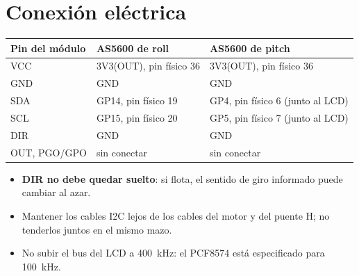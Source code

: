 \documentclass[11pt,a4paper]{article}
\begin{document}
\section{Conexión eléctrica}
\begin{center}
\begin{tabular}{lll}
\toprule
Pin del módulo & AS5600 de roll & AS5600 de pitch\\
\midrule
VCC & 3V3(OUT), pin físico 36 & 3V3(OUT), pin físico 36\\
GND & GND & GND\\
SDA & GP14, pin físico 19 & GP4, pin físico 6 (junto al LCD)\\
SCL & GP15, pin físico 20 & GP5, pin físico 7 (junto al LCD)\\
DIR & GND & GND\\
OUT, PGO/GPO & sin conectar & sin conectar\\
\bottomrule
\end{tabular}
\end{center}
\begin{itemize}
\item \textbf{DIR no debe quedar suelto}: si flota, el sentido de giro informado puede cambiar al azar.
\item Mantener los cables I2C lejos de los cables del motor y del puente H; no tenderlos juntos en el mismo mazo.
\item No subir el bus del LCD a 400~kHz: el PCF8574 está especificado para 100~kHz.
\end{itemize}
\end{document}
